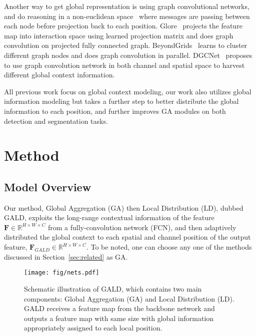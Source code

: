 \documentclass{bmvc2k}
\begin{document}
Another way to get global representation is using graph convolutional networks, and do reasoning in a non-euclidean space~\cite{zhang2019dynamic,zhangli_dgcn,beyond_grids,graph_reason} where messages are passing between each node before projection back to each position. 
Glore~\cite{graph_reason} projects the feature map into interaction space using learned projection matrix and does graph convolution on projected fully connected graph. BeyondGrids~\cite{beyond_grids} learns to cluster different graph nodes and does graph convolution in parallel. DGCNet~\cite{zhangli_dgcn} proposes to use graph convolution network in both channel and spatial space to harvest different global context information.


All previous work focus on global context modeling, our work also utilizes global information modeling but takes a further step to better distribute the global information to each position, and further improves GA modules on both detection and segmentation tasks. \section{Method}


\subsection{Model Overview}
Our method, Global Aggregation (GA) then Local Distribution (LD), dubbed GALD, exploits the long-range contextual information of the feature $ \mathbf{F} \in \mathbb{R}^{ H \times W \times C }$  from a fully-convolution network (FCN), and then adaptively distributed the global context to each spatial and channel position of the output feature, $\mathbf{F}_{GALD} \in \mathbb{R}^{ H \times W \times C }$.
To be noted, one can choose any one of the methods discussed in Section~\ref{sec:related} as GA.



\begin{figure*}
\centering
\texttt{[image: fig/nets.pdf]}
\caption{Schematic illustration of GALD, which contains two main components: Global Aggregation (GA) and Local Distribution (LD). 
GALD receives a feature map from the backbone network and outputs a feature map with same size with global information appropriately assigned to each local position.
}
\label{fig:whole}
\end{figure*}
\end{document}
